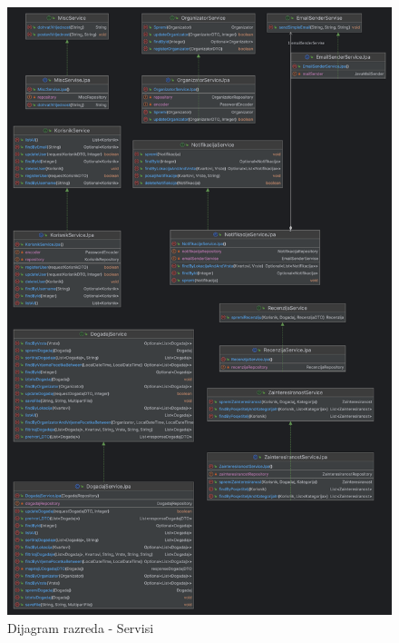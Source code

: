 			\begin{figure}[H]
				\includegraphics[scale=0.13]{dijagramiKlasa/servisi.png} %
				\centering
				\caption{Dijagram razreda - Servisi}
				\label{fig:promjene}
			\end{figure}
			
